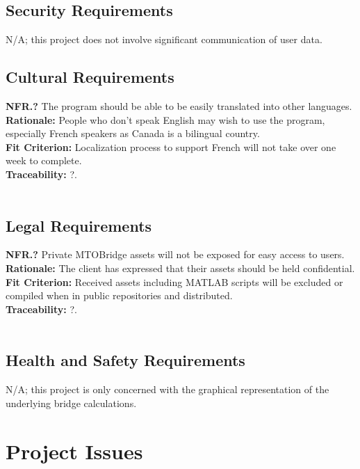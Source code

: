 \documentclass[12pt]{article}
\begin{document}
\subsection{Security Requirements}

N/A; this project does not involve significant communication of user data.\\

\subsection{Cultural Requirements}

  \textbf{NFR.?} The program should be able to be easily translated into other languages.\\
  \textbf{Rationale:} People who don't speak English may wish to use the program, especially French speakers as Canada is a bilingual country.\\
  \textbf{Fit Criterion:} Localization process to support French will not take over one week to complete.\\
  \textbf{Traceability:} ?.\\\\

\subsection{Legal Requirements}

  \textbf{NFR.?} Private MTOBridge assets will not be exposed for easy access to users.\\
  \textbf{Rationale:} The client has expressed that their assets should be held confidential.\\
  \textbf{Fit Criterion:} Received assets including MATLAB scripts will be excluded or compiled when in public repositories and distributed.\\
  \textbf{Traceability:} ?.\\\\

\subsection{Health and Safety Requirements}

N/A; this project is only concerned with the graphical representation of the underlying bridge calculations.\\

\section{Project Issues}
\end{document}

